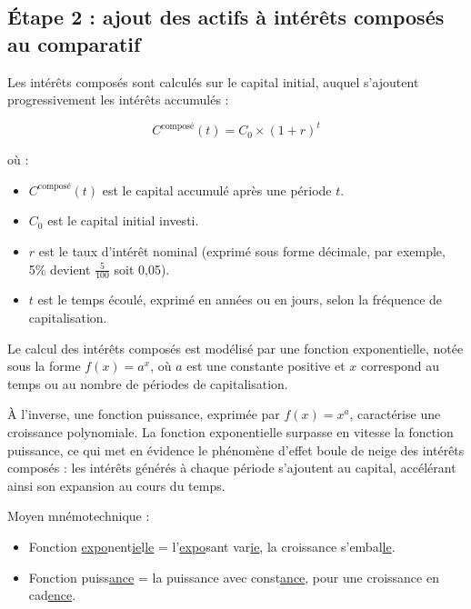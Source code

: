 \documentclass{article}
\begin{document}
\subsection*{Étape 2 : ajout des actifs à intérêts composés au comparatif}
\begin{tcolorbox}[
    colback=lightgreen, 
    colframe=lightgreen, 
    boxrule=0.5pt, 
    arc=0pt, 
    left=10pt, 
    right=10pt, 
    top=6pt, 
    bottom=6pt, 
    boxsep=2pt, 
    before upper={\faLightbulb\hspace{10pt}}
]
    Les intérêts composés sont calculés sur le capital initial, auquel s'ajoutent progressivement les intérêts accumulés :
    

    \[
    C^{\text{composé}}(t) = C_0 \times (1 + r)^t
    \]
    
    où :
    \begin{itemize}
        \item \( C^{\text{composé}}(t) \) est le capital accumulé après une période \( t \).
        \item \( C_0 \) est le capital initial investi.
        \item \( r \) est le taux d'intérêt nominal (exprimé sous forme décimale, par exemple, 5\% devient $\frac{5}{100}$ soit 0,05).
        \item \( t \) est le temps écoulé, exprimé en années ou en jours, selon la fréquence de capitalisation.
    \end{itemize}
\end{tcolorbox}

\begin{tcolorbox}[
    colback=lightgreen, 
    colframe=lightgreen, 
    boxrule=0.5pt, 
    arc=0pt, 
    left=10pt, 
    right=10pt, 
    top=6pt, 
    bottom=6pt, 
    boxsep=2pt, 
    before upper={\faLightbulb\hspace{10pt}}
]
    Le calcul des intérêts composés est modélisé par une fonction exponentielle, notée sous la forme $f(x)=a^x$, où $a$ est une constante positive et $x$ correspond au temps ou au nombre de périodes de capitalisation.

    À l'inverse, une fonction puissance, exprimée par $f(x)=x^a$, caractérise une croissance polynomiale. La fonction exponentielle surpasse en vitesse la fonction puissance, ce qui met en évidence le phénomène d'effet boule de neige des intérêts composés : les intérêts générés à chaque période s'ajoutent au capital, accélérant ainsi son expansion au cours du temps.

    Moyen mnémotechnique : 
    \begin{itemize}
        \item Fonction \underline{expo}nent\underline{ie}l\underline{le} = l'\underline{expo}sant var\underline{ie}, la croissance s'embal\underline{le}.
        \item Fonction puiss\underline{ance} = la puissance avec const\underline{ance}, pour une croissance en cad\underline{ence}.
    \end{itemize}

\end{tcolorbox}
\end{document}
